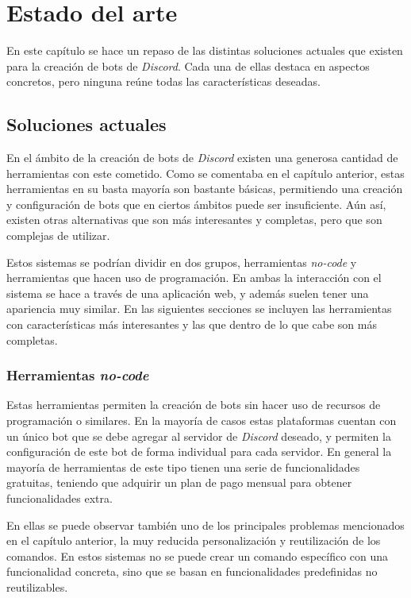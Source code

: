 \chapter{Estado del arte}

En este capítulo se hace un repaso de las distintas soluciones actuales que existen para la creación de bots de \textit{Discord}. Cada una de ellas destaca en aspectos concretos, pero ninguna reúne todas las características deseadas.

\section{Soluciones actuales}

En el ámbito de la creación de bots de \textit{Discord} existen una generosa cantidad de herramientas con este cometido. Como se comentaba en el capítulo anterior, estas herramientas en su basta mayoría son bastante básicas, permitiendo una creación y configuración de bots que en ciertos ámbitos puede ser insuficiente. Aún así, existen otras alternativas que son más interesantes y completas, pero que son complejas de utilizar.

Estos sistemas se podrían dividir en dos grupos, herramientas \textit{no-code} y herramientas que hacen uso de programación. En ambas la interacción con el sistema se hace a través de una aplicación web, y además suelen tener una apariencia muy similar. En las siguientes secciones se incluyen las herramientas con características más interesantes y las que dentro de lo que cabe son más completas.

\subsection{Herramientas \textit{no-code}}

Estas herramientas permiten la creación de bots sin hacer uso de recursos de programación o similares. En la mayoría de casos estas plataformas cuentan con un único bot que se debe agregar al servidor de \textit{Discord} deseado, y permiten la configuración de este bot de forma individual para cada servidor. En general la mayoría de herramientas de este tipo tienen una serie de funcionalidades gratuitas, teniendo que adquirir un plan de pago mensual para obtener funcionalidades extra.

En ellas se puede observar también uno de los principales problemas mencionados en el capítulo anterior, la muy reducida personalización y reutilización de los comandos. En estos sistemas no se puede crear un comando específico con una funcionalidad concreta, sino que se basan en funcionalidades predefinidas no reutilizables.


